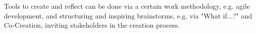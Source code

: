Tools to create and reflect can be done via a certain work methodology, e.g. agile development, and structuring and inspiring brainstorms, e.g. via "What if...?" and Co-Creation, inviting stakeholders in the creation process.

%


%

%
